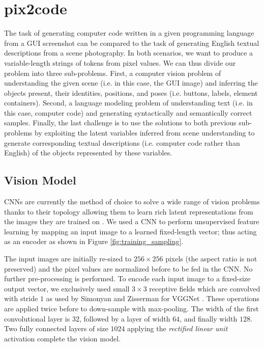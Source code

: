 \documentclass{article}
\begin{document}
\section{pix2code}

The task of generating computer code written in a given programming language from a GUI screenshot can be compared to the task of generating English textual descriptions from a scene photography. In both scenarios, we want to produce a variable-length strings of tokens from pixel values. We can thus divide our problem into three sub-problems. First, a computer vision problem of understanding the given scene (i.e. in this case, the GUI image) and inferring the objects present, their identities, positions, and poses (i.e. buttons, labels, element containers). Second, a language modeling problem of understanding text (i.e. in this case, computer code) and generating syntactically and semantically correct samples. Finally, the last challenge is to use the solutions to both previous sub-problems by exploiting the latent variables inferred from scene understanding to generate corresponding textual descriptions (i.e. computer code rather than English) of the objects represented by these variables.

\subsection{Vision Model}

CNNs are currently the method of choice to solve a wide range of vision problems thanks to their topology allowing them to learn rich latent representations from the images they are trained on \cite{sermanet2013overfeat, krizhevsky2012imagenet}. We used a CNN to perform unsupervised feature learning by mapping an input image to a learned fixed-length vector; thus acting as an encoder as shown in Figure \ref{fig:training_sampling}.

The input images are initially re-sized to $256\times256$ pixels (the aspect ratio is not preserved) and the pixel values are normalized before to be fed in the CNN. No further pre-processing is performed. To encode each input image to a fixed-size output vector, we exclusively used small $3\times3$ receptive fields which are convolved with stride $1$ as used by Simonyan and Zisserman for VGGNet \cite{simonyan2014very}. These operations are applied twice before to down-sample with max-pooling. The width of the first convolutional layer is $32$, followed by a layer of width $64$, and finally width $128$. Two fully connected layers of size $1024$ applying the \emph{rectified linear unit} activation complete the vision model.
\end{document}
